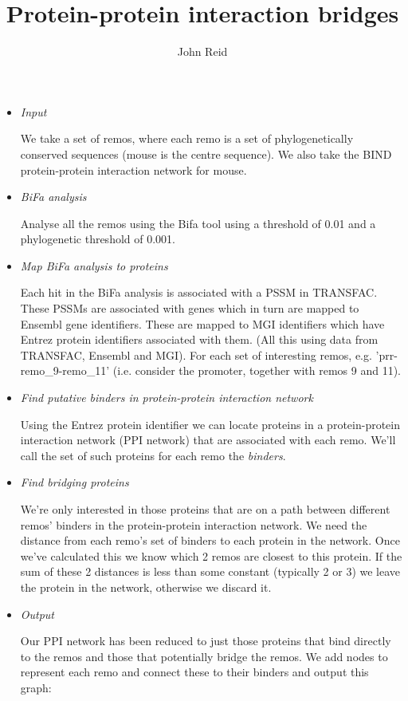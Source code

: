 \documentclass[a4paper,11pt]{article}
\author{John Reid}
\title{Protein-protein interaction bridges}
\begin{document}
\maketitle

\begin{itemize}
\item \emph{Input}

We take a set of remos, where each remo is a set of phylogenetically conserved sequences (mouse is the centre sequence). We also take the BIND protein-protein interaction network for mouse.

\item \emph{BiFa analysis}

Analyse all the remos using the Bifa tool using a threshold of 0.01 and a phylogenetic threshold of 0.001.

\item \emph{Map BiFa analysis to proteins}

Each hit in the BiFa analysis is associated with a PSSM in TRANSFAC. These PSSMs are associated with genes which in turn are mapped to Ensembl gene identifiers. These are mapped to MGI identifiers which have Entrez protein identifiers associated with them. (All this using data from TRANSFAC, Ensembl and MGI).
For each set of interesting remos, e.g. 'prr-remo\_9-remo\_11' (i.e. consider the promoter, together with remos 9 and 11).

\item \emph{Find putative binders in protein-protein interaction network}

Using the Entrez protein identifier we can locate proteins in a protein-protein interaction network (PPI network) that are associated with each remo. We'll call the set of such proteins for each remo the \emph{binders}.

\item \emph{Find bridging proteins}

We're only interested in those proteins that are on a path between different remos' binders in the protein-protein interaction network. We need the distance from each remo's set of binders to each protein in the network. Once we've calculated this we know which 2 remos are closest to this protein. If the sum of these 2 distances is less than some constant (typically 2 or 3) we leave the protein in the network, otherwise we discard it.

\item \emph{Output}

Our PPI network has been reduced to just those proteins that bind directly to the remos and those that potentially bridge the remos. We add nodes to represent each remo and connect these to their binders and output this graph:


\end{itemize}
\end{document}
